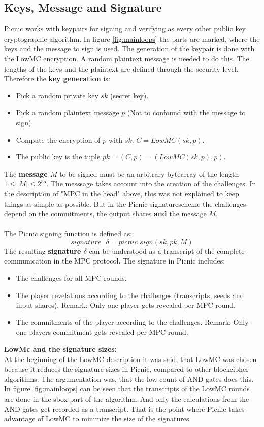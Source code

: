 \documentclass[]{article}
\begin{document}
\subsection{Keys, Message and Signature}
Picnic works with keypairs for signing and verifying as every other public key cryptographic algorithm. In figure \ref{fig:mainloops} the parts are marked, where the keys and the message to sign is used. The generation of the keypair is done with the LowMC encryption. A random plaintext message is needed to do this. The lengths of the keys and the plaintext are defined through the security level. Therefore the \textbf{key generation} is:
\begin{itemize}
\item{Pick a random private key $sk$ (secret key).}
\item{Pick a random plaintext message $p$ (Not to confound with the message to sign).}
\item{Compute the encryption of $p$ with $sk$: $C = LowMC(sk, p)$.}
\item{The public key is the tuple $pk = (C,p) = (LowMC(sk,p), p)$.}
\end{itemize}
The \textbf{message $M$} to be signed must be an arbitrary bytearray of the length $1 \leq \vert M  \vert \leq 2^{55}$. The messsage takes account into the creation of the challenges. In the description of "MPC in the head" above, this was not explained to keep things as simple as possible. But in the Picnic signaturescheme the challenges depend on the commitments, the output shares \textbf{and} the message $M$.\\ \\
The Picnic signing function is defined as:
\[signature\text{ }\delta = picnic\_sign(sk, pk, M)\]
The resulting \textbf{signature $\delta$} can be understood as a transcript of the complete communication in the MPC protocol. The signature in Picnic includes:
\begin{itemize}
\item{The challenges for all MPC rounds.}
\item{The player revelations according to the challenges (transcripts, seeds and input shares). Remark: Only one player gets revealed per MPC round.}
\item{The commitments of the player according to the challenges. Remark: Only one players commitment gets revealed per MPC round.}
\end{itemize}
\textbf{LowMc and the signature sizes:}\\
At the beginning of the LowMC description it was said, that LowMC was chosen because it reduces the signature sizes in Picnic, compared to other blockcipher algorithms. The argumentation was, that the low count of AND gates does this. In figure \ref{fig:mainloops} can be seen that the transcripts of the LowMC rounds are done in the sbox-part of the algorithm. And only the calculations from the AND gates get recorded as a transcript. That is the point where Picnic takes advantage of LowMC to minimize the size of the signatures.
\end{document}
